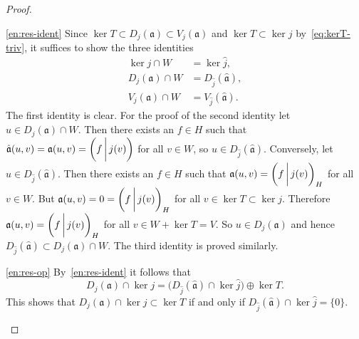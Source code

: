 \documentclass[a4paper,oneside,12pt]{amsart}
\theoremstyle{plain}
\theoremstyle{definition}
\begin{document}
\begin{proof}
\begin{asparaenum}
\item[\ref{en:res-ident}]
Since $\ker T \subset D_j({{\mathfrak{{a}}}}) \subset V_j({{\mathfrak{{a}}}})$ and
$\ker T \subset \ker j$ by~\eqref{eq:kerT-triv}, it suffices to show the three identities
\begin{align*}
  \ker j \cap W &= \ker\hat{j},\\
  D_j({{\mathfrak{{a}}}}) \cap W &= D_{\hat{j}}({{\mathfrak{{\hat{a}}}}}), \\
  V_j({{\mathfrak{{a}}}}) \cap W &= V_{\hat{j}}({{\mathfrak{{\hat{a}}}}}).
\end{align*}
The first identity is clear. For the proof of the second identity
let $u \in D_j({{\mathfrak{{a}}}}) \cap W$. Then there exists an $f \in H$
such that ${{\mathfrak{{\hat{a}}}}}(u,v) = {{\mathfrak{{a}}}}(u,v) = {{\ifthenelse{\equal{auto}{auto}}{\left({f}\mkern3mu{\biggm|}\mkern3mu {j(v)}\right)}{}
\ifthenelse{\equal{auto}{b}}{\bigl({f}\mkern3mu{\biggm|}\mkern3mu {j(v)}\bigr)}{}
\ifthenelse{\equal{auto}{B}}{\Bigl({f}\mkern3mu{\bigm|}\mkern3mu {j(v)}\Bigr)}{}
}}$
for all $v\in W$, so $u \in D_{\hat{j}}({{\mathfrak{{\hat{a}}}}})$.
Conversely, let $u \in D_{\hat{j}}({{\mathfrak{{\hat{a}}}}})$. 
Then there exists an $f\in H$ such that ${{\mathfrak{{a}}}}(u,v)={{\ifthenelse{\equal{auto}{auto}}{\left({f}\mkern3mu{\biggm|}\mkern3mu {j(v)}\right)}{}
\ifthenelse{\equal{auto}{b}}{\bigl({f}\mkern3mu{\biggm|}\mkern3mu {j(v)}\bigr)}{}
\ifthenelse{\equal{auto}{B}}{\Bigl({f}\mkern3mu{\bigm|}\mkern3mu {j(v)}\Bigr)}{}
}}_H$ for all $v\in W$. 
But ${{\mathfrak{{a}}}}(u,v)=0={{\ifthenelse{\equal{auto}{auto}}{\left({f}\mkern3mu{\biggm|}\mkern3mu {j(v)}\right)}{}
\ifthenelse{\equal{auto}{b}}{\bigl({f}\mkern3mu{\biggm|}\mkern3mu {j(v)}\bigr)}{}
\ifthenelse{\equal{auto}{B}}{\Bigl({f}\mkern3mu{\bigm|}\mkern3mu {j(v)}\Bigr)}{}
}}_H$ for all $v\in\ker T\subset\ker j$. Therefore ${{\mathfrak{{a}}}}(u,v)={{\ifthenelse{\equal{auto}{auto}}{\left({f}\mkern3mu{\biggm|}\mkern3mu {j(v)}\right)}{}
\ifthenelse{\equal{auto}{b}}{\bigl({f}\mkern3mu{\biggm|}\mkern3mu {j(v)}\bigr)}{}
\ifthenelse{\equal{auto}{B}}{\Bigl({f}\mkern3mu{\bigm|}\mkern3mu {j(v)}\Bigr)}{}
}}_H$ for all $v\in W+\ker T=V$.
So $u\in D_j({{\mathfrak{{a}}}})$ and hence $D_{\hat{j}}({{\mathfrak{{\hat{a}}}}})\subset D_j({{\mathfrak{{a}}}})\cap W$.
The third identity is proved similarly.

\item[\ref{en:res-op}] 
By~\ref{en:res-ident} it follows that
\[
	D_j({{\mathfrak{{a}}}})\cap\ker j = \bigl(D_{\hat{j}}({{\mathfrak{{\hat{a}}}}})\cap\ker\hat{j}\bigr)\oplus\ker T.
\]
This shows that $D_j({{\mathfrak{{a}}}})\cap\ker j\subset\ker T$ if and only if $D_{\hat{j}}({{\mathfrak{{\hat{a}}}}})\cap\ker\hat{j}=\{0\}$.


\end{asparaenum}
\end{proof}
\end{document}
